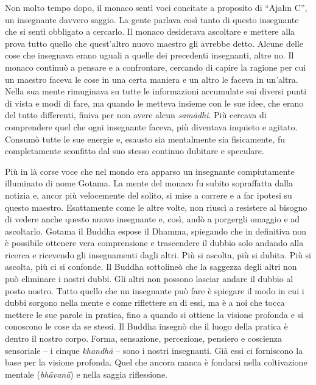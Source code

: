 Non molto tempo dopo, il monaco sentì voci concitate a proposito di
``Ajahn C'', un insegnante davvero saggio. La gente parlava così tanto
di questo insegnante che si sentì obbligato a cercarlo. Il monaco
desiderava ascoltare e mettere alla prova tutto quello che quest'altro
nuovo maestro gli avrebbe detto. Alcune delle cose che insegnava erano
uguali a quelle dei precedenti insegnanti, altre no. Il monaco continuò
a pensare e a confrontare, cercando di capire la ragione per cui un
maestro faceva le cose in una certa maniera e un altro le faceva in
un'altra. Nella sua mente rimuginava su tutte le informazioni accumulate
sui diversi punti di vista e modi di fare, ma quando le metteva insieme
con le sue idee, che erano del tutto differenti, finiva per non avere
alcun \emph{samādhi}. Più cercava di comprendere quel che ogni
insegnante faceva, più diventava inquieto e agitato. Consumò tutte le
sue energie e, esausto sia mentalmente sia fisicamente, fu completamente
sconfitto dal suo stesso continuo dubitare e speculare.

Più in là corse voce che nel mondo era apparso un insegnante
compiutamente illuminato di nome Gotama. La mente del monaco fu subito
sopraffatta dalla notizia e, ancor più velocemente del solito, si mise a
correre e a far ipotesi su questo maestro. Esattamente come le altre
volte, non riuscì a resistere al bisogno di vedere anche questo nuovo
insegnante e, così, andò a porgergli omaggio e ad ascoltarlo. Gotama il
Buddha espose il Dhamma, spiegando che in definitiva non è possibile
ottenere vera comprensione e trascendere il dubbio solo andando alla
ricerca e ricevendo gli insegnamenti dagli altri. Più si ascolta, più si
dubita. Più si ascolta, più ci si confonde. Il Buddha sottolineò che la
saggezza degli altri non può eliminare i nostri dubbi. Gli altri non
possono lasciar andare il dubbio al posto nostro. Tutto quello che un
insegnante può fare è spiegare il modo in cui i dubbi sorgono nella
mente e come riflettere su di essi, ma è a noi che tocca mettere le sue
parole in pratica, fino a quando si ottiene la visione profonda e si
conoscono le cose da se stessi. Il Buddha insegnò che il luogo della
pratica è dentro il nostro corpo. Forma, sensazione, percezione,
pensiero e coscienza sensoriale -- i cinque \emph{khandhā} -- sono i
nostri insegnanti. Già essi ci forniscono la base per la visione
profonda. Quel che ancora manca è fondarsi nella coltivazione mentale
(\emph{bhāvanā}) e nella saggia riflessione.

